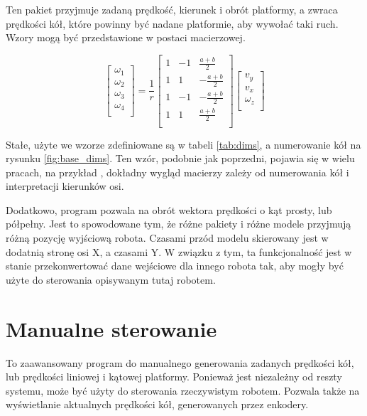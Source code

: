 	Ten pakiet przyjmuje zadaną prędkość, kierunek i obrót platformy, a zwraca prędkości kół, które powinny być nadane platformie, aby wywołać taki ruch.
	Wzory mogą być przedstawione w postaci macierzowej.
	
	\begin{equation}
	\begin{bmatrix}
	\omega_1 \\
	\omega_2 \\
	\omega_3 \\
	\omega_4 \\
	\end{bmatrix}
	=
	\frac{1}{r}
	\begin{bmatrix}
	1 & -1 & \frac{a+b}{2} \\
	1 & 1 & -\frac{a+b}{2} \\
	1 & -1 & -\frac{a+b}{2} \\
	1 & 1 & \frac{a+b}{2} \\
	\end{bmatrix}
	\begin{bmatrix}
	v_y \\
	v_x \\
	\omega_z \\
	\end{bmatrix}
	\end{equation}
	
	Stałe, użyte we wzorze zdefiniowane są w tabeli \ref{tab:dims}, a numerowanie kół na rysunku \ref{fig:base_dims}.
	Ten wzór, podobnie jak poprzedni, pojawia się w wielu pracach, na przykład \cite{wheels}, dokładny wygląd macierzy zależy od numerowania kół i interpretacji kierunków osi.
	
	Dodatkowo, program pozwala na obrót wektora prędkości o kąt prosty, lub półpełny. 
	Jest to spowodowane tym, że różne pakiety i różne modele przyjmują różną pozycję wyjściową robota.
	Czasami przód modelu skierowany jest w dodatnią stronę osi X, a czasami Y. W związku z tym, ta funkcjonalność jest w stanie przekonwertować dane wejściowe dla innego robota tak,
	aby mogły być użyte do sterowania opisywanym tutaj robotem.
	

\section{Manualne sterowanie}
\label{sec:lalkarz}
	To zaawansowany program do manualnego generowania zadanych prędkości kół, lub prędkości liniowej i kątowej platformy.
	Ponieważ jest niezależny od reszty systemu, może być użyty do sterowania rzeczywistym robotem.
	Pozwala także na wyświetlanie aktualnych prędkości kół, generowanych przez enkodery.
	

